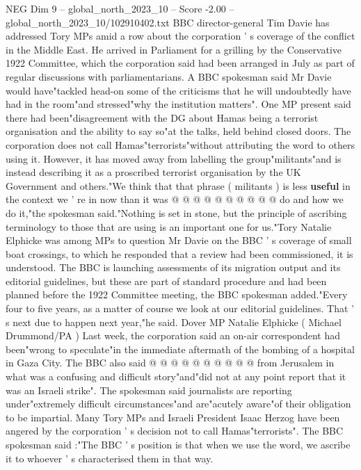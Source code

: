 \begin{textsample}{NEG Dim 9 – global\_north\_2023\_10 – Score -2.00 – global\_north\_2023\_10/102910402.txt}  \label{ex:f9_neg_155}
BBC director-general Tim Davie has addressed Tory MPs amid a row about the corporation ' s coverage of the conflict in the Middle East.
He arrived in Parliament for a grilling by the Conservative 1922 Committee, which the corporation said had been arranged in July as part of regular discussions with parliamentarians.
A BBC spokesman said Mr Davie would have"tackled head-on some of the criticisms that he will undoubtedly have had in the room"and stressed"why the institution matters".
One MP present said there had been"disagreement with the DG about Hamas being a terrorist organisation and the ability to say so"at the talks, held behind closed doors.
The corporation does not call Hamas"terrorists"without attributing the word to others using it.
However, it has moved away from labelling the group"militants"and is instead describing it as a proscribed terrorist organisation by the UK Government and others."We think that that phrase ( militants ) is less \textbf{useful} in the context we ' re in now than it was @ @ @ @ @ @ @ @ @ @ do and how we do it,"the spokesman said."Nothing is set in stone, but the principle of ascribing terminology to those that are using is an important one for us."Tory Natalie Elphicke was among MPs to question Mr Davie on the BBC ' s coverage of small boat crossings, to which he responded that a review had been commissioned, it is understood.
The BBC is launching assessments of its migration output and its editorial guidelines, but these are part of standard procedure and had been planned before the 1922 Committee meeting, the BBC spokesman added."Every four to five years, as a matter of course we look at our editorial guidelines.
That ' s next due to happen next year,"he said.
Dover MP Natalie Elphicke ( Michael Drummond/PA ) Last week, the corporation said an on-air correspondent had been"wrong to speculate"in the immediate aftermath of the bombing of a hospital in Gaza City.
The BBC also said @ @ @ @ @ @ @ @ @ @ from Jerusalem in what was a confusing and difficult story"and"did not at any point report that it was an Israeli strike".
The spokesman said journalists are reporting under"extremely difficult circumstances"and are"acutely aware"of their obligation to be impartial.
Many Tory MPs and Israeli President Isaac Herzog have been angered by the corporation ' s decision not to call Hamas"terrorists".
The BBC spokesman said :"The BBC ' s position is that when we use the word, we ascribe it to whoever ' s characterised them in that way.

\end{textsample}
